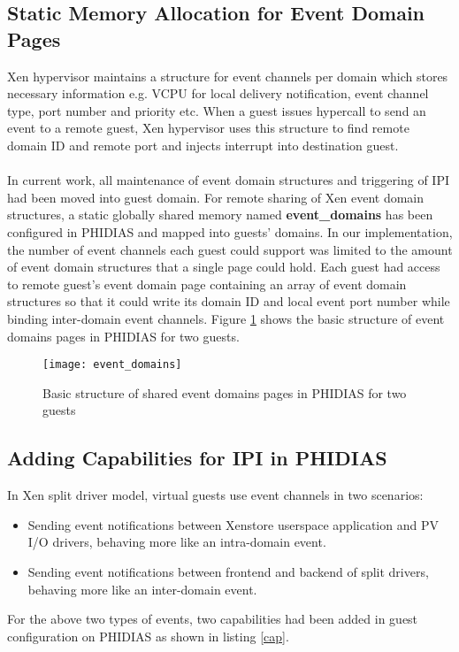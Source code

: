 \subsection{Static Memory Allocation for Event Domain Pages \label{sec:eventsdomains}}
Xen hypervisor maintains a structure for event channels per domain which stores necessary information e.g. VCPU for local delivery notification, event channel type, port number and priority etc. When a guest issues hypercall to send an event to a remote guest, Xen hypervisor uses this structure to find remote domain ID and remote port and injects interrupt into destination guest. 
\\
\\
In current work, all maintenance of event domain structures and triggering of IPI had been moved into guest domain. For remote sharing of Xen event domain structures, a static globally shared memory named \textbf{event\_domains} has been configured in PHIDIAS and mapped into guests' domains. In our implementation, the number of event channels each guest could support was limited to the amount of event domain structures that a single page could hold. Each guest had access to remote guest's event domain page containing an array of event domain structures so that it could write its domain ID and local event port number while binding inter-domain event channels. Figure \ref{event_domains} shows the basic structure of event domains pages in PHIDIAS for two guests.

\begin{figure}[!htbp]
	\centering
	\texttt{[image: event\_domains]}
	\caption{Basic structure of shared event domains pages in PHIDIAS for two guests}
	\label{event_domains}
\end{figure}

\subsection{Adding Capabilities for IPI in PHIDIAS \label{sec:eventsdomains}}
In Xen split driver model, virtual guests use event channels in two scenarios:
\begin{itemize}
	\item Sending event notifications between Xenstore userspace application and PV I/O drivers, behaving more like an intra-domain event.
	\item Sending event notifications between frontend and backend of split drivers, behaving more like an inter-domain event.
\end{itemize}
For the above two types of events, two capabilities had been added in guest configuration on PHIDIAS as shown in listing \ref{cap}.\\

